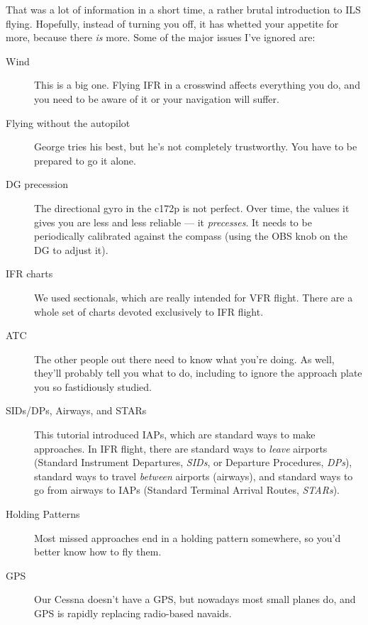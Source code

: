
That was a lot of information in a short time, a rather brutal
introduction to ILS flying.  Hopefully, instead of turning you off, it
has whetted your appetite for more, because there \emph{is} more.
Some of the major issues I've ignored are:

\begin{description}
\item[Wind] This is a big one.  Flying IFR in a crosswind affects
  everything you do, and you need to be aware of it or your navigation
  will suffer.
\item[Flying without the autopilot] George tries his best, but he's
  not completely trustworthy.  You have to be prepared to go it
  alone.
\item[DG precession] The directional gyro in the c172p is not perfect.
  Over time, the values it gives you are less and less reliable --- it
  \emph{precesses}.  It needs to be periodically calibrated against
  the compass (using the OBS knob on the DG to adjust it).
\item[IFR charts] We used sectionals, which are really intended for
  VFR flight.  There are a whole set of charts devoted exclusively to
  IFR flight.
\item[ATC] The other people out there need to know what you're doing.
  As well, they'll probably tell you what to do, including to ignore
  the approach plate you so fastidiously studied.
\item[SIDs/DPs, Airways, and STARs] This tutorial introduced IAPs,
  which are standard ways to make approaches.  In IFR flight, there
  are standard ways to \emph{leave} airports (Standard Instrument
  Departures, \emph{SIDs}, or Departure Procedures, \emph{DPs}),
  standard ways to travel \emph{between} airports (airways), and
  standard ways to go from airways to IAPs (Standard Terminal Arrival
  Routes, \emph{STARs}).
\item[Holding Patterns] Most missed approaches end in a holding
  pattern somewhere, so you'd better know how to fly them.
\item[GPS] Our Cessna doesn't have a GPS, but nowadays most small
  planes do, and GPS is rapidly replacing radio-based navaids.
\end{description}

